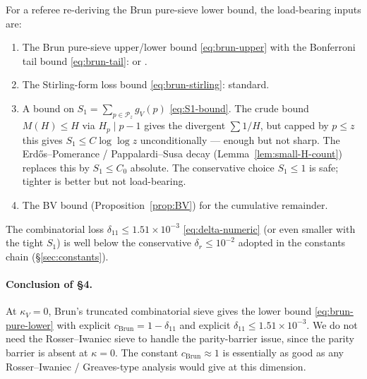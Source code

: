 \begin{remark}
\label{rem:sieve-checklist}
For a referee re-deriving the Brun pure-sieve lower bound, the
load-bearing inputs are:
\begin{enumerate}
  \item The Brun pure-sieve upper/lower bound \eqref{eq:brun-upper}
    with the Bonferroni tail bound \eqref{eq:brun-tail}:
    \cite[\S2.3 Thm.~2.2 + Lemma~2.2]{HalberstamRichert1974} or
    \cite[\S6.4 Prop.~6.7 + eq.~(6.7)]{IwaniecKowalski2004}.
  \item The Stirling-form loss bound \eqref{eq:brun-stirling}: standard.
  \item A bound on $S_{1} = \sum_{p \in \mathcal{P}_{z}} g_{V}(p)$
    \eqref{eq:S1-bound}. The crude bound $M(H) \leq H$ via $H_{p}
    \mid p - 1$ gives the divergent $\sum 1/H$, but capped by
    $p \leq z$ this gives $S_{1} \leq C \log \log z$ unconditionally
    --- enough but not sharp. The Erd\H{o}s--Pomerance /
    Pappalardi--Susa decay (Lemma~\ref{lem:small-H-count}) replaces
    this by $S_{1} \leq C_{0}$ absolute. The conservative choice
    $S_{1} \leq 1$ is safe; tighter is better but not load-bearing.
  \item The BV bound (Proposition~\ref{prop:BV}) for the cumulative
    remainder.
\end{enumerate}
The combinatorial loss $\delta_{11} \leq 1.51 \times 10^{-3}$
\eqref{eq:delta-numeric} (or even smaller with the tight $S_{1}$) is
well below the conservative $\delta_{r} \leq 10^{-2}$ adopted in the
constants chain (\S\ref{sec:constants}).
\end{remark}

\paragraph{Conclusion of \S4.}
At $\kappa_{V} = 0$, Brun's truncated combinatorial sieve gives the
lower bound \eqref{eq:brun-pure-lower} with explicit
$c_{\mathrm{Brun}} = 1 - \delta_{11}$ and explicit $\delta_{11} \leq
1.51 \times 10^{-3}$. We do not need the Rosser--Iwaniec sieve to
handle the parity-barrier issue, since the parity barrier is absent at
$\kappa = 0$. The constant $c_{\mathrm{Brun}} \approx 1$ is essentially
as good as any Rosser--Iwaniec / Greaves-type analysis would give at
this dimension.

